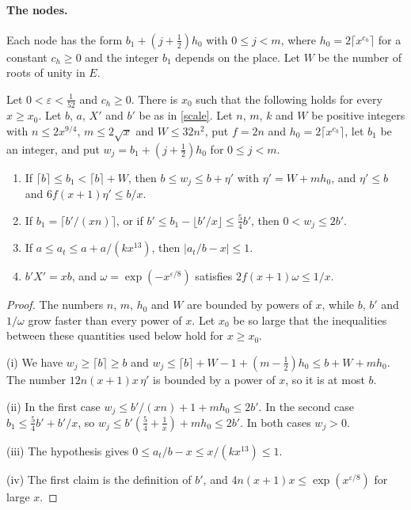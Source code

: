 \paragraph{The nodes.} Each node has the form $b_1+(j+\frac12)h_0$ with $0\le j<m$, where $h_0=2\lceil x^{c_h}\rceil$ for a constant $c_h\ge0$ and the integer $b_1$ depends on the place. Let $W$ be the number of roots of unity in $E$.

\begin{proposition}\label{nodes}
Let $0<\varepsilon<\frac1{52}$ and $c_h\ge0$. There is $x_0$ such that the following holds for every $x\ge x_0$. Let $b$, $a$, $X'$ and $b'$ be as in \eqref{scale}. Let $n$, $m$, $k$ and $W$ be positive integers with $n\le2x^{9/4}$, $m\le2\sqrt x$ and $W\le32n^2$, put $f=2n$ and $h_0=2\lceil x^{c_h}\rceil$, let $b_1$ be an integer, and put $w_j=b_1+(j+\frac12)h_0$ for $0\le j<m$.
\begin{enumerate}
\item[(i)] If $\lceil b\rceil\le b_1<\lceil b\rceil+W$, then $b\le w_j\le b+\eta'$ with $\eta'=W+mh_0$, and $\eta'\le b$ and $6f(x+1)\eta'\le b/x$.
\item[(ii)] If $b_1=\lceil b'/(xn)\rceil$, or if $b'\le b_1-\lfloor b'/x\rfloor\le\frac54b'$, then $0<w_j\le2b'$.
\item[(iii)] If $a\le a_t\le a+a/(kx^{13})$, then $\lvert a_t/b-x\rvert\le1$.
\item[(iv)] $b'X'=xb$, and $\omega=\exp(-x^{\varepsilon/8})$ satisfies $2f(x+1)\omega\le1/x$.
\end{enumerate}
\end{proposition}

\begin{proof}
The numbers $n$, $m$, $h_0$ and $W$ are bounded by powers of $x$, while $b$, $b'$ and $1/\omega$ grow faster than every power of $x$. Let $x_0$ be so large that the inequalities between these quantities used below hold for $x\ge x_0$.

(i) We have $w_j\ge\lceil b\rceil\ge b$ and $w_j\le\lceil b\rceil+W-1+(m-\frac12)h_0\le b+W+mh_0$. The number $12n(x+1)x\,\eta'$ is bounded by a power of $x$, so it is at most $b$.

(ii) In the first case $w_j\le b'/(xn)+1+mh_0\le2b'$. In the second case $b_1\le\frac54b'+b'/x$, so $w_j\le b'(\frac54+\frac1x)+mh_0\le2b'$. In both cases $w_j>0$.

(iii) The hypothesis gives $0\le a_t/b-x\le x/(kx^{13})\le1$.

(iv) The first claim is the definition of $b'$, and $4n(x+1)x\le\exp(x^{\varepsilon/8})$ for large $x$.
\end{proof}

